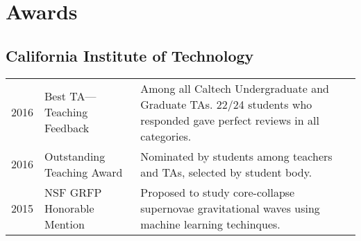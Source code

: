 \documentclass[]{yubo-resume-openfont}
\begin{document}
\begin{minipage}[t]{0.66\textwidth}
\ifisCS
    \ExperienceSec
    \ResearchSec
\else
    \ResearchSec
    \ExperienceSec
\fi


\section{Awards}
\subsection{California Institute of Technology}
\begin{tabular}{p{20pt}p{80pt}p{7.5cm}}
    2016 & Best TA---Teaching Feedback & Among all Caltech Undergraduate and
    Graduate TAs. 22/24 students who responded gave perfect reviews in all
    categories.\\
    2016 & Outstanding Teaching Award & Nominated by students among teachers and
    TAs, selected by student body.\\
    2015 & NSF GRFP Honorable Mention & Proposed to study core-collapse
    supernovae gravitational waves using machine learning techinques.
\end{tabular}
\sectionsep

\end{minipage}
\end{document}
